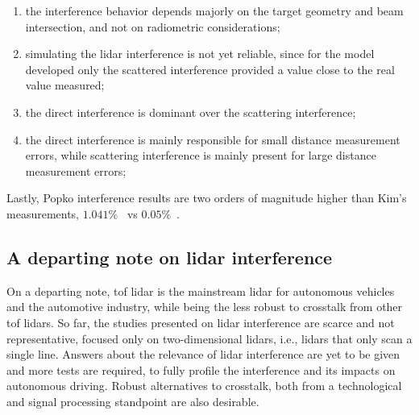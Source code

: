 \begin{enumerate}
	\item the interference behavior depends majorly on the target geometry and beam intersection, and not on radiometric considerations;
	\item simulating the \ac{lidar} interference is not yet reliable, since for the model developed only the scattered interference provided a value close to the real value measured;
	\item the direct interference is dominant over the scattering interference;
	\item the direct interference is mainly responsible for small distance measurement errors, while scattering interference is mainly present for large distance measurement errors;
\end{enumerate}

Lastly, Popko \etal interference results are two orders of magnitude higher than Kim's \etal measurements, $1.041 \%$~\cite{Popko2019b} vs $0.05\%$~\cite{Kim2015a}.

\subsection{A departing note on \ac{lidar} interference}
On a departing note, \ac{tof} \ac{lidar} is the mainstream \ac{lidar} for autonomous vehicles and the automotive industry, while being the less robust to crosstalk from other \ac{tof} \acp{lidar}. So far, the studies presented on \ac{lidar} interference are scarce and not representative, focused only on two-dimensional \acp{lidar}, i.e., \acp{lidar} that only scan a single line. Answers about the relevance of \ac{lidar} interference are yet to be given and more tests are required, to fully profile the interference and its impacts on autonomous driving. Robust alternatives to crosstalk, both from a technological and signal processing standpoint are also desirable.
